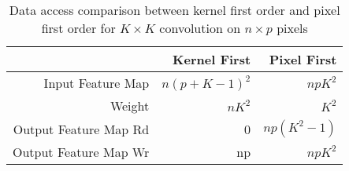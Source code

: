 \begin{table}[htbp]
    \centering
    \caption{Data access comparison between kernel first order and pixel first order for $K\times K$ convolution on $n\times p$ pixels}
      \begin{tabular}{|r|r|r|}
      \hline
            & Kernel First & Pixel First \bigstrut\\
      \hline
      Input Feature Map & $n(p+K-1)^2$ & $npK^2$ \bigstrut\\
      \hline
      Weight & $nK^2$ & $K^2$ \bigstrut\\
      \hline
      Output Feature Map Rd & 0 & $np(K^2-1)$ \bigstrut\\
      \hline
      Output Feature Map Wr & np & $npK^2$ \bigstrut\\
      \hline
      \end{tabular}%
    \label{tab:ram_acc}%
  \end{table}%